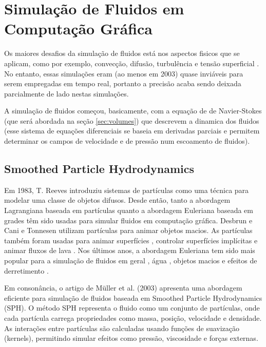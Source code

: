 \section{Simulação de Fluidos em Computação Gráfica}

Os maiores desafios da simulação de fluidos está nos aspectos fisicos que se aplicam, como por exemplo, convecção, difusão, turbulência e tensão superficial \cite{desbrun1996}. No entanto, essas simulações eram (ao menos em 2003) quase inviáveis para serem empregadas em tempo real, portanto a precisão acaba sendo deixada parcialmente de lado nestas simulações.

A simulação de fluidos começou, basicamente, com a equação de de Navier-Stokes (que será abordada na seção \ref{sec:volumes}) que descrevem a dinamica dos fluidos (esse sistema de equações diferenciais se baseia em derivadas parciais e permitem determinar os campos de velocidade e de pressão num escoamento de fluidos). 

\subsection{Smoothed Particle Hydrodynamics}

Em 1983, T. Reeves \cite{reeves1983} introduziu sistemas de partículas como uma técnica para modelar uma classe de objetos difusos. Desde então, tanto a abordagem Lagrangiana baseada em partículas quanto a abordagem Euleriana baseada em grades têm sido usadas para simular fluidos em computação gráfica. Desbrun e Cani \cite{desbrun1996} e Tonnesen \cite{tonnesen1998} utilizam partículas para animar objetos macios. As partículas também foram usadas para animar superfícies \cite{witkin1991}, controlar superfícies implícitas \cite{bloomenthal1997} e animar fluxos de lava \cite{carlson2002}. Nos últimos anos, a abordagem Euleriana tem sido mais popular para a simulação de fluidos em geral \cite{fedkiw2001}, água \cite{stam1999, foster1996, enright2002}, objetos macios \cite{muller2002} e efeitos de derretimento \cite{carlson2002}.

Em consonância, o artigo de Müller et al. (2003) \cite{muller2003} apresenta uma abordagem eficiente para simulação de fluidos baseada em Smoothed Particle Hydrodynamics (SPH). O método SPH representa o fluido como um conjunto de partículas, onde cada partícula carrega propriedades como massa, posição, velocidade e densidade. As interações entre partículas são calculadas usando funções de suavização (kernels), permitindo simular efeitos como pressão, viscosidade e forças externas.

